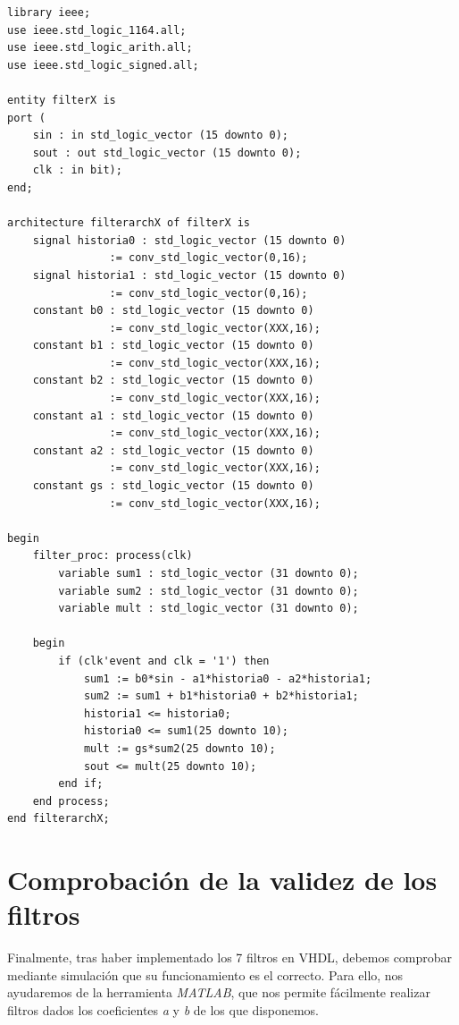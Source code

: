 \documentclass[a4paper,12pt]{report}
\begin{document}
\lstset{language=VHDL}
\begin{framed}
\begin{lstlisting}[basicstyle=\footnotesize\ttfamily]
library ieee;
use ieee.std_logic_1164.all;
use ieee.std_logic_arith.all;
use ieee.std_logic_signed.all;

entity filterX is
port (
    sin : in std_logic_vector (15 downto 0);
    sout : out std_logic_vector (15 downto 0);
	clk : in bit);
end;

architecture filterarchX of filterX is
    signal historia0 : std_logic_vector (15 downto 0) 
                := conv_std_logic_vector(0,16);
    signal historia1 : std_logic_vector (15 downto 0) 
                := conv_std_logic_vector(0,16);
    constant b0 : std_logic_vector (15 downto 0) 
                := conv_std_logic_vector(XXX,16);
    constant b1 : std_logic_vector (15 downto 0) 
                := conv_std_logic_vector(XXX,16);
    constant b2 : std_logic_vector (15 downto 0) 
                := conv_std_logic_vector(XXX,16);
    constant a1 : std_logic_vector (15 downto 0) 
                := conv_std_logic_vector(XXX,16);
    constant a2 : std_logic_vector (15 downto 0) 
                := conv_std_logic_vector(XXX,16);
    constant gs : std_logic_vector (15 downto 0) 
                := conv_std_logic_vector(XXX,16);

begin
    filter_proc: process(clk)
        variable sum1 : std_logic_vector (31 downto 0);
        variable sum2 : std_logic_vector (31 downto 0);
        variable mult : std_logic_vector (31 downto 0);

    begin
        if (clk'event and clk = '1') then
            sum1 := b0*sin - a1*historia0 - a2*historia1;
            sum2 := sum1 + b1*historia0 + b2*historia1;
            historia1 <= historia0;
            historia0 <= sum1(25 downto 10);
            mult := gs*sum2(25 downto 10);
            sout <= mult(25 downto 10);
        end if;
    end process;
end filterarchX;
\end{lstlisting}
\end{framed}

\section{Comprobación de la validez de los filtros}
Finalmente, tras haber implementado los 7 filtros en VHDL, debemos comprobar mediante simulación que su funcionamiento es el correcto. Para ello, nos ayudaremos de la herramienta \emph{MATLAB}, que nos permite fácilmente realizar filtros dados los coeficientes \emph{a} y \emph{b} de los que disponemos.
\end{document}

